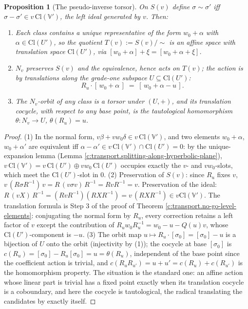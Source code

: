 \documentclass[11pt]{article}
\newtheorem{proposition}[theorem]{Proposition}
\theoremstyle{definition}
\theoremstyle{plain}
\providecommand{\Cl}{}\renewcommand{\Cl}{\mathrm{Cl}}
\begin{document}
\begin{proposition}[The pseudo-inverse torsor]\label{c:transport.pseudo-inverse-torsor}
On $S(v)$ define $\sigma \sim \sigma'$ iff $\sigma - \sigma' \in v\,\Cl(\mathbb{V}')$, the left ideal generated by $v$. Then:
\begin{enumerate}
\item Each class contains a unique representative of the form $w_0 + \alpha$ with $\alpha \in \Cl(U')$, so the quotient $T(v) := S(v)/\!\sim$ is an affine space with translation space $\Cl(U')$, via $[w_0 + \alpha] + \xi = [w_0 + \alpha + \xi]$.
\item $N_v$ preserves $S(v)$ and the equivalence, hence acts on $T(v)$; the action is by translations along the grade-one subspace $U \subseteq \Cl(U')$:
\[
R_u \cdot [\,w_0 + \alpha\,] \;=\; [\,w_0 + \alpha - u\,].
\]
\item The $N_v$-orbit of any class is a torsor under $(U, +)$, and its translation cocycle, with respect to any base point, is the tautological homomorphism $\theta : N_v \to U$, $\theta(R_u) = u$.
\end{enumerate}
\end{proposition}
\begin{proof}
(1) In the normal form, $v\beta + vw_0\delta \in v\,\Cl(\mathbb{V}')$, and two elements $w_0 + \alpha$, $w_0 + \alpha'$ are equivalent iff $\alpha - \alpha' \in v\,\Cl(\mathbb{V}') \cap \Cl(U') = 0$: by the unique-expansion lemma (Lemma \ref{c:transport.splitting-along-hyperbolic-plane}), $v\,\Cl(\mathbb{V}') = v\,\Cl(U') \oplus vw_0\,\Cl(U')$ occupies exactly the $v$- and $vw_0$-slots, which meet the $\Cl(U')$-slot in $0$. (2) Preservation of $S(v)$: since $R_u$ fixes $v$, $v\,(R\sigma R^{-1})\,v = R\,(v\sigma v)\,R^{-1} = RvR^{-1} = v$. Preservation of the ideal: $R\,(vX)\,R^{-1} = (RvR^{-1})(RXR^{-1}) = v\,(RXR^{-1}) \in v\Cl(\mathbb{V}')$. The translation formula is Step 3 of the proof of Theorem \ref{c:transport.no-go-level-elements}: conjugating the normal form by $R_u$, every correction retains a left factor of $v$ except the contribution of $R_u w_0 R_u^{-1} = w_0 - u - Q(u)v$, whose $\Cl(U')$-component is $-u$. (3) The orbit map $u \mapsto R_u \cdot [\sigma_0] = [\sigma_0] - u$ is a bijection of $U$ onto the orbit (injectivity by (1)); the cocycle at base $[\sigma_0]$ is $c(R_u) = [\sigma_0] - R_u[\sigma_0] = u = \theta(R_u)$, independent of the base point since the coefficient action is trivial, and $c(R_uR_{u'}) = u + u' = c(R_u) + c(R_{u'})$ is the homomorphism property. The situation is the standard one: an affine action whose linear part is trivial has a fixed point exactly when its translation cocycle is a coboundary, and here the cocycle is tautological, the radical translating the candidates by exactly itself.

\end{proof}
\end{document}
